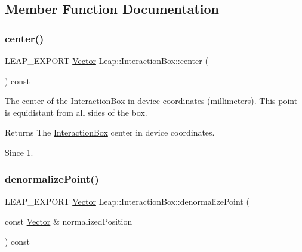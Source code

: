 \subsection{Member Function Documentation}
\mbox{\label{class_leap_1_1_interaction_box_afa8a46d30c62040123b10410dccdf2da}} 
\subsubsection{\texorpdfstring{center()}{center()}}
{\footnotesize\ttfamily L\+E\+A\+P\+\_\+\+E\+X\+P\+O\+RT \hyperlink{struct_leap_1_1_vector}{Vector} Leap\+::\+Interaction\+Box\+::center (\begin{DoxyParamCaption}{ }\end{DoxyParamCaption}) const}

The center of the \hyperlink{class_leap_1_1_interaction_box}{Interaction\+Box} in device coordinates (millimeters). This point is equidistant from all sides of the box.


\begin{DoxyCodeInclude}
\end{DoxyCodeInclude}


\begin{DoxyReturn}{Returns}
The \hyperlink{class_leap_1_1_interaction_box}{Interaction\+Box} center in device coordinates. 
\end{DoxyReturn}
\begin{DoxySince}{Since}
1. 
\end{DoxySince}
\mbox{\label{class_leap_1_1_interaction_box_a7624e98e1327f4c5bdb79bf7a2aeacc3}} 
\subsubsection{\texorpdfstring{denormalize\+Point()}{denormalizePoint()}}
{\footnotesize\ttfamily L\+E\+A\+P\+\_\+\+E\+X\+P\+O\+RT \hyperlink{struct_leap_1_1_vector}{Vector} Leap\+::\+Interaction\+Box\+::denormalize\+Point (\begin{DoxyParamCaption}\item[{const \hyperlink{struct_leap_1_1_vector}{Vector} \&}]{normalized\+Position }\end{DoxyParamCaption}) const}

